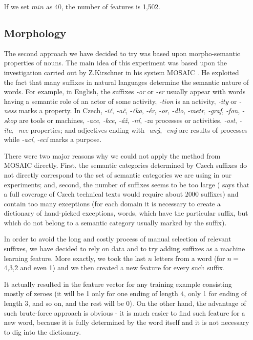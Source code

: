 \documentclass[letterpaper]{article}
\begin{document}
If we set $min$ as 40, the number of features is 1,502.

\subsection{Morphology}
The second approach we have decided to try was based upon morpho-semantic properties of nouns.
The main idea of this experiment was based upon the investigation carried out by Z.Kirschner in his system MOSAIC \cite{kirschner1983}. He exploited the fact that many suffixes in natural languages determine the semantic nature of words. For example, in English, the suffixes {\it -or} or {\it -er} usually appear with words having a semantic role of an actor of some activity, {\it -tion} is an activity, {\it -ity} or {\it -ness} marks a property. In Czech,  {\it -i\v{c}}, {\it -a\v{c}}, {\it -\v{c}ka}, {\it -\'{e}r}, {\it -or}, {\it -dlo}, {\it -metr}, {\it -graf}, {\it -fon}, {\it -skop} are tools or machines, {\it -ace}, {\it -kce}, {\it -\'{a}\v{z}}, {\it -n\'{i}}, {\it -za} processes or activities,
{\it -ost}, {\it -ita}, {\it -nce} properties; and adjectives ending with {\it -an\'{y}}, {\it -en\'{y}} are results of processes while {\it -ac\'{i}}, {\it -ec\'{i}} marks a purpose.

There were two major reasons why we could not apply the method from MOSAIC directly. First, the semantic categories determined by Czech suffixes do not directly correspond to the set of semantic categories we are using in our experiments; and, second, the number of suffixes seems to be too large (\cite{kirschner1983} says that a full coverage of Czech technical texts would require about 2000 suffixes) and contain too many exceptions (for each domain it is necessary to create a dictionary of hand-picked exceptions, words, which have the particular suffix, but which do not belong to a semantic category usually marked by the suffix).     
  
In order to avoid the long and costly process of manual selection of relevant suffixes, we have decided to rely on data and  
to try adding suffixes as a machine learning feature.  
More exactly, we took the last $n$ letters from 
a word (for $n=$ 4,3,2 and even 1) and we then created a new feature for every such suffix. 

It actually resulted in the feature vector for any training example consisting mostly of zeroes 
(it will be 1 only for one ending of length 4, only 1 for ending of length 3, and so on, 
and the rest will be 0). On the other hand, the advantage of such brute-force approach is obvious - 
it is much easier to find such feature 
for a new word, because it is fully determined by the word itself and it is not necessary to dig into the dictionary.
\end{document}
